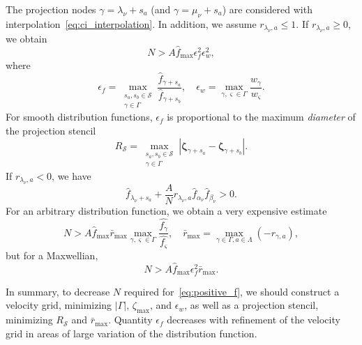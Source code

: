 \documentclass[]{elsarticle} %
\newcommand{\bzeta}{\boldsymbol{\zeta}}
\begin{document}
The projection nodes \(\gamma = \lambda_\nu+s_a\) (and \(\gamma = \mu_\nu+s_a\))
are considered with interpolation~\eqref{eq:ci_interpolation}.
In addition, we assume \(r_{\lambda_\nu,a} \leq 1\).
If \(r_{\lambda_\nu,a} \geq 0\), we obtain
\begin{equation}\label{eq:positive_f_lambda2+}
    N > A \hat{f}_{\max} \epsilon_f^2 \epsilon_w^2,
\end{equation}
where
\begin{equation}\label{eq:epsilon_f}
    \epsilon_f = \max_{\substack{s_a,s_b\in\mathcal{S}\\\gamma\in\Gamma}} \frac{\hat{f}_{\gamma+s_a}}{\hat{f}_{\gamma+s_b}}, \quad
    \epsilon_w = \max_{\gamma,\varsigma\in\Gamma} \frac{w_\gamma}{w_\varsigma}.
\end{equation}
For smooth distribution functions, \(\epsilon_f\) is proportional to the maximum \emph{diameter} of the projection stencil
\begin{equation}\label{eq:stencil_diameter}
    R_\mathcal{S} = \max_{\substack{s_a,s_b\in\mathcal{S}\\\gamma\in\Gamma}}
        \left| \bzeta_{\gamma+s_a} - \bzeta_{\gamma+s_b} \right|.
\end{equation}
If \(r_{\lambda_\nu,a} < 0\), we have
\begin{equation}\label{eq:positive_f_lambda-}
    \hat{f}_{\lambda_\nu+s_a} + \frac{A}{N}r_{\lambda_\nu,a} \hat{f}_{\alpha_\nu}\hat{f}_{\beta_\nu} > 0.
\end{equation}
For an arbitrary distribution function, we obtain a very expensive estimate
\begin{equation}\label{eq:positive_f_lambda2-}
    N > A \hat{f}_{\max} \bar{r}_{\max} \max_{\gamma,\varsigma\in\Gamma}\frac{\hat{f_\gamma}}{\hat{f_\varsigma}}, \quad
    \bar{r}_{\max} = \max_{\gamma\in\Gamma,a\in\Lambda}( -r_{\gamma,a} ),
\end{equation}
but for a Maxwellian,
\begin{equation}\label{eq:positive_f_lambda2-maxw}
    N > A \hat{f}_{\max} \epsilon_f^2 \bar{r}_{\max}.
\end{equation}

In summary, to decrease \(N\) required for~\eqref{eq:positive_f},
we should construct a velocity grid, minimizing \(|\Gamma|\), \(\zeta_{\max}\), and \(\epsilon_w\),
as well as a projection stencil, minimizing \(R_\mathcal{S}\) and \(\bar{r}_{\max}\).
Quantity \(\epsilon_f\) decreases with refinement of the velocity grid in areas of large variation
of the distribution function.
\end{document}
